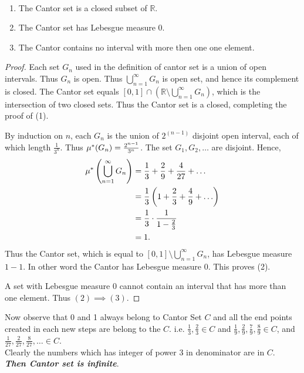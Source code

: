 \begin{theorem}
    \ 
    \begin{enumerate}
        \item The Cantor set is a closed subset of $\mathds{R}$.
        \item The Cantor set has Lebesgue measure $0$.
        \item The Cantor contains no interval with more then one one element.
    \end{enumerate}
\end{theorem}
\begin{proof}
    Each set $G_n$ used in the definition of cantor set is a union of open intervals. Thus  $G_n$ is open. Thus  $\bigcup_{n=1}^{\infty}G_n$ is open set,
    and hence its complement is closed. The Cantor set equals $[0,1]\cap\left( \mathds{R}\setminus \bigcup_{n=1}^{\infty}G_n \right)$, which is the intersection of 
    two closed sets. Thus the Cantor set is a closed, completing the proof of (1).

    By induction on $n$, each  $G_n$ is the union of  $2^{(n-1)}$ disjoint open interval, each of which length  $\frac{1}{3^{n}}$. Thus $\mu^{*}(G_n)=\frac{2^{n-1}}{3^{n}}$.
    The set $G_1,G_2,\ldots$ are disjoint. Hence,
    \begin{align*}
        \mu^{*}\left( \bigcup_{n=1}^{\infty}G_n \right) &= \frac{1}{3}+\frac{2}{9}+\frac{4}{27}+\ldots\\
                                                     &= \frac{1}{3}\left( 1 +\frac{2}{3}+\frac{4}{9}+\ldots\right) \\
                                                     &=\frac{1}{3}\cdot\frac{1}{1-\frac{2}{3}}\\
                                                     &=1.
    \end{align*}
    Thus the Cantor set, which is equal to $[0,1]\setminus \bigcup_{n=1}^{\infty}G_n$, has Lebesgue measure $1-1$. In other word the Cantor has Lebesgue measure  $0$.
    This proves (2).

    A set with Lebesgue measure  $0$ cannot contain an interval that has more than one element. Thus  $(2)\implies(3)$.
\end{proof}


Now observe that 0 and 1 always belong to  Cantor Set $C$ and all the end points created in each new steps are belong to  the  $C$. 
i.e. $\frac{1}{3},\frac{2}{3}\in C$ and $\frac{1}{9},\frac{2}{9},\frac{7}{9},\frac{8}{9}\in C$, and  $\frac{1}{27},\frac{2}{27},\frac{8}{27},\ldots\in C$.\\
Clearly the numbers which has integer of power 3 in denominator are in $C$. \\
\textbf{\textit{Then  Cantor set is infinite}}.

